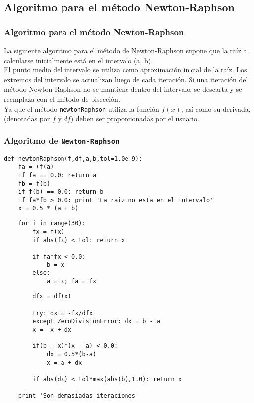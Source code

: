 \subsection{Algoritmo para el método Newton-Raphson}
\begin{frame}
\frametitle{Algoritmo para el método Newton-Raphson}
La siguiente algoritmo para el método de Newton-Raphson supone que la raíz a calcularse inicialmente está en el intervalo (a, b).
\\
\medskip
El punto medio del intervalo se utiliza como aproximación inicial de la raíz. Los extremos del intervalo se actualizan luego de cada iteración. Si una iteración del método Newton-Raphson no se mantiene dentro del intervalo, se descarta y se reemplaza
con el método de bisección.
\\
\medskip
Ya que el método \texttt{newtonRaphson} utiliza la función $f(x)$, así como su derivada, (denotadas por $f$ y $df$) deben ser proporcionadas por
el usuario.
\end{frame}
\begin{frame}[fragile]
\frametitle{Algoritmo de \texttt{Newton-Raphson}}
\begin{lstlisting}
def newtonRaphson(f,df,a,b,tol=1.0e-9):
    fa = (f(a)
    if fa == 0.0: return a
    fb = f(b)
    if f(b) == 0.0: return b
    if fa*fb > 0.0: print 'La raiz no esta en el intervalo'
    x = 0.5 * (a + b)
\end{lstlisting}
\end{frame}
\begin{frame}[fragile]
\begin{lstlisting}
    for i in range(30):
        fx = f(x)
        if abs(fx) < tol: return x

        if fa*fx < 0.0:
            b = x
        else:
            a = x; fa = fx
\end{lstlisting}
\end{frame}
\begin{frame}[fragile]
\begin{lstlisting}
        dfx = df(x)
        
        try: dx = -fx/dfx
        except ZeroDivisionError: dx = b - a
        x =  x + dx
        
        if(b - x)*(x - a) < 0.0:
            dx = 0.5*(b-a)
            x = a + dx
        
        if abs(dx) < tol*max(abs(b),1.0): return x
    
    print 'Son demasiadas iteraciones'
\end{lstlisting}
\end{frame}
